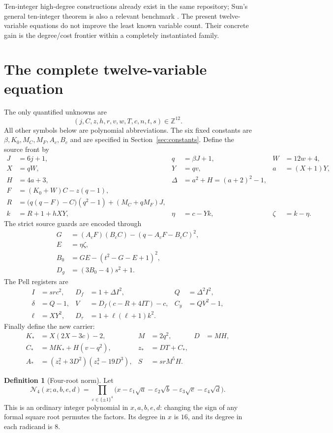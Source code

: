 \documentclass[11pt]{article}
\newcommand{\Z}{\mathbb Z}\newcommand{\N}{\mathbb N}
\newcommand{\NN}{\mathcal N_4}\newcommand{\PP}{\mathcal P}
\theoremstyle{definition}\newtheorem{definition}[theorem]{Definition}
\theoremstyle{remark}\newtheorem{remark}[theorem]{Remark}
\begin{document}
Ten-integer high-degree constructions already exist in the same repository;
Sun's general ten-integer theorem is also a relevant benchmark
\cite{sun}. The present twelve-variable equations do not improve the
least known variable count. Their concrete gain is the degree/cost frontier
within a completely instantiated family.

\section{The complete twelve-variable equation}
\label{sec:equation}

The only quantified unknowns are
\[
 (j,C,z,h,r,v,w,T,c,n,t,s)\in\Z^{12}.
\]
All other symbols below are polynomial abbreviations. The six fixed
constants are $\beta,K_0,M_C,M_F,A_c,B_c$ and are specified in Section~\ref{sec:constants}.
Define the source front by
\begin{align}
 J&=6j+1,& q&=\beta J+1,& W&=12w+4,\\
 X&=qW,&Y&=qv,& a&=(X+1)Y,\\
 H&=4a+3,& \Delta&=a^2+H=(a+2)^2-1,\label{eq:base}\\
 F&=(K_0+W)C-z(q-1),\nonumber\\
 R&=\bigl(q(q-F)-C\bigr)(q^2-1)+(M_C+qM_F)J,\label{eq:R}\\
 k&=R+1+hXY,& \eta&=c-Yk,&\zeta&=k-\eta.
\end{align}
The strict source guards are encoded through
\begin{align}
 G&=(A_cF)(B_cC)-(q-A_cF-B_cC)^2,\\
 E&=\eta\zeta,\\
 B_0&=GE-(t^2-G-E+1)^2,\\
 D_g&=(3B_0-4)s^2+1.\label{eq:guard}
\end{align}
The Pell registers are
\begin{align}
 I&=src^2,& D_f&=1+\Delta I^2,& Q&=\Delta^2I^2,\\
 \delta&=Q-1,&V&=D_f(c-R+4IT)-c,& C_y&=QV^2-1,\\
 \ell&=XY^2,&D_\tau&=1+\ell(\ell+1)k^2.
\end{align}
Finally define the new carrier:
\begin{align}
 K_*&=X(2X-3c)-2,& M&=2q^2,&D&=MH,\\
 C_*&=MK_*+H(v-q^2),& z_*&=DT+C_*,\\
 A_*&=(z_*^2+3D^2)(z_*^3-19D^3),& S&=srM^5H.\label{eq:carrier}
\end{align}

\begin{definition}[Four-root norm]
Let
\begin{equation}\label{eq:norm}
 \NN(x;a,b,e,d)=
 \prod_{\varepsilon\in\{\pm1\}^4}
 \bigl(x-\varepsilon_1\sqrt a-\varepsilon_2\sqrt b
          -\varepsilon_3\sqrt e-\varepsilon_4\sqrt d\bigr).
\end{equation}
This is an ordinary integer polynomial in $x,a,b,e,d$: changing the sign
of any formal square root permutes the factors. Its degree in $x$ is $16$,
and its degree in each radicand is $8$.
\end{definition}
\end{document}
